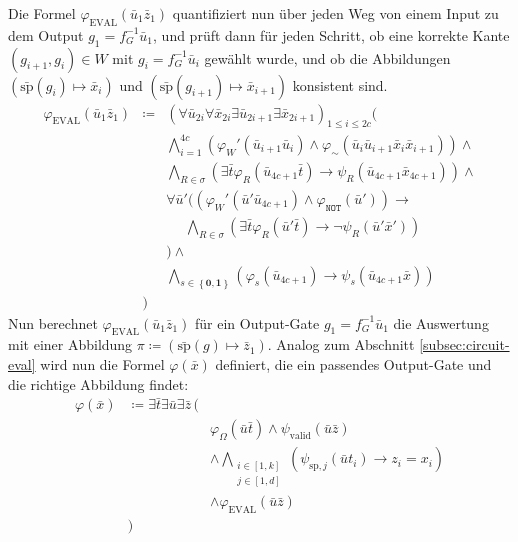 Die Formel $\varphi_{\mathrm{EVAL}}\left(\bar{u}_{1}\bar{z}_{1}\right)$
quantifiziert nun über jeden Weg von einem Input zu dem Output $g_{1}=f_{G}^{-1}\bar{u}_{1}$,
und prüft dann für jeden Schritt, ob eine korrekte Kante $\left(g_{i+1},g_{i}\right)\in W$
mit $g_{i}=f_{G}^{-1}\bar{u}_{i}$ gewählt wurde, und ob die Abbildungen
$\left(\bar{\mathrm{sp}}\left(g_{i}\right)\mapsto\bar{x}_{i}\right)$
und $\left(\bar{\mathrm{sp}}\left(g_{i+1}\right)\mapsto\bar{x}_{i+1}\right)$
konsistent sind. 
\begin{eqnarray*}
\varphi_{\mathrm{EVAL}}\left(\bar{u}_{1}\bar{z}_{1}\right) & \coloneqq & \left(\forall\bar{u}_{2i}\forall\bar{x}_{2i}\exists\bar{u}_{2i+1}\exists\bar{x}_{2i+1}\right)_{1\leqslant i\leqslant2c}(\\
 &  & \bigwedge_{i=1}^{4c}\left(\varphi_{W}'\left(\bar{u}_{i+1}\bar{u}_{i}\right)\wedge\varphi_{\sim}\left(\bar{u}_{i}\bar{u}_{i+1}\bar{x}_{i}\bar{x}_{i+1}\right)\right)\wedge\\
 &  & \bigwedge_{R\in\sigma}\left(\exists\bar{t}\varphi_{R}\left(\bar{u}_{4c+1}\bar{t}\right)\rightarrow\psi_{R}\left(\bar{u}_{4c+1}\bar{x}_{4c+1}\right)\right)\wedge\\
 &  & \forall\bar{u}'(\left(\varphi_{W}'\left(\bar{u}'\bar{u}_{4c+1}\right)\wedge\varphi_{\mathtt{NOT}}\left(\bar{u}'\right)\right)\rightarrow\\
 &  & \,\,\,\,\,\,\,\,\bigwedge_{R\in\sigma}\left(\exists\bar{t}\varphi_{R}\left(\bar{u}'\bar{t}\right)\rightarrow\neg\psi_{R}\left(\bar{u}'\bar{x}'\right)\right)\\
 &  & )\wedge\\
 &  & \bigwedge_{s\in\left\{ \mathbf{0},\mathbf{1}\right\} }\left(\varphi_{s}\left(\bar{u}_{4c+1}\right)\rightarrow\psi_{s}\left(\bar{u}_{4c+1}\bar{x}\right)\right)\\
 & )
\end{eqnarray*}
Nun berechnet $\varphi_{\mathrm{EVAL}}\left(\bar{u}_{1}\bar{z}_{1}\right)$
für ein Output-Gate $g_{1}=f_{G}^{-1}\bar{u}_{1}$ die Auswertung
mit einer Abbildung $\pi\coloneqq\left(\bar{\mathrm{sp}}\left(g\right)\mapsto\bar{z}_{1}\right)$.
Analog zum Abschnitt \ref{subsec:circuit-eval} wird nun die Formel
$\varphi\left(\bar{x}\right)$ definiert, die ein passendes Output-Gate
und die richtige Abbildung findet: 
\begin{eqnarray*}
\varphi\left(\bar{x}\right) & \coloneqq\exists\bar{t}\exists\bar{u}\exists\bar{z}\,(\\
 &  & \varphi_{\Omega}\left(\bar{u}\bar{t}\right)\wedge\psi_{\mathrm{valid}}\left(\bar{u}\bar{z}\right)\\
 &  & \wedge\bigwedge_{\substack{i\in\left[1,k\right]\\
j\in\left[1,d\right]
}
}\left(\psi_{\mathrm{sp},j}\left(\bar{u}t_{i}\right)\rightarrow z_{i}=x_{i}\right)\\
 &  & \wedge\varphi_{\mathrm{EVAL}}\left(\bar{u}\bar{z}\right)\\
 & )
\end{eqnarray*}

